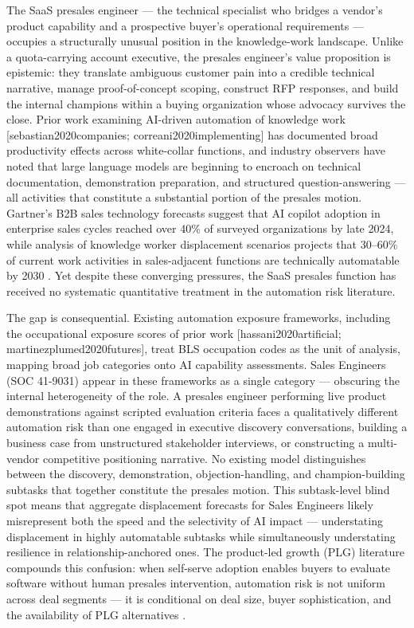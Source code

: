 \documentclass[10pt, conference]{IEEEtran}
\begin{document}
\label{sec:introduction}

The SaaS presales engineer --- the technical specialist who bridges a vendor's product capability and a prospective buyer's operational requirements --- occupies a structurally unusual position in the knowledge-work landscape. Unlike a quota-carrying account executive, the presales engineer's value proposition is epistemic: they translate ambiguous customer pain into a credible technical narrative, manage proof-of-concept scoping, construct RFP responses, and build the internal champions within a buying organization whose advocacy survives the close. Prior work examining AI-driven automation of knowledge work [sebastian2020companies; correani2020implementing] has documented broad productivity effects across white-collar functions, and industry observers have noted that large language models are beginning to encroach on technical documentation, demonstration preparation, and structured question-answering --- all activities that constitute a substantial portion of the presales motion. Gartner's B2B sales technology forecasts suggest that AI copilot adoption in enterprise sales cycles reached over 40\% of surveyed organizations by late 2024, while analysis of knowledge worker displacement scenarios projects that 30--60\% of current work activities in sales-adjacent functions are technically automatable by 2030 \cite{johnk2020ready}. Yet despite these converging pressures, the SaaS presales function has received no systematic quantitative treatment in the automation risk literature.

The gap is consequential. Existing automation exposure frameworks, including the occupational exposure scores of prior work [hassani2020artificial; martinezplumed2020futures], treat BLS occupation codes as the unit of analysis, mapping broad job categories onto AI capability assessments. Sales Engineers (SOC 41-9031) appear in these frameworks as a single category --- obscuring the internal heterogeneity of the role. A presales engineer performing live product demonstrations against scripted evaluation criteria faces a qualitatively different automation risk than one engaged in executive discovery conversations, building a business case from unstructured stakeholder interviews, or constructing a multi-vendor competitive positioning narrative. No existing model distinguishes between the discovery, demonstration, objection-handling, and champion-building subtasks that together constitute the presales motion. This subtask-level blind spot means that aggregate displacement forecasts for Sales Engineers likely misrepresent both the speed and the selectivity of AI impact --- understating displacement in highly automatable subtasks while simultaneously understating resilience in relationship-anchored ones. The product-led growth (PLG) literature compounds this confusion: when self-serve adoption enables buyers to evaluate software without human presales intervention, automation risk is not uniform across deal segments --- it is conditional on deal size, buyer sophistication, and the availability of PLG alternatives \cite{davis2021varieties}.
\end{document}
